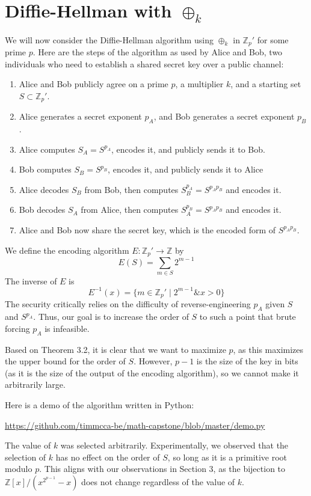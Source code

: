 \documentclass{article}
\newcommand{\zee}{\mathbb{Z}}
\begin{document}
\section{Diffie-Hellman with $\oplus_k$}

We will now consider the Diffie-Hellman algorithm using $\oplus_k$
in $\zee_p'$ for some prime $p$. Here are the steps of the algorithm
as used by Alice and Bob, two individuals who need to establish a
shared secret key over a public channel:
\begin{enumerate}
    \item Alice and Bob publicly agree on a prime $p$,
    a multiplier $k$, and a starting set $S \subset \zee_p'$.
    \item Alice generates a secret exponent $p_A$, and Bob
    generates a secret exponent $p_B$.
    \item Alice computes $S_A = S^{p_A}$, encodes it,
    and publicly sends it to Bob.
    \item Bob computes $S_B = S^{p_B}$, encodes it,
    and publicly sends it to Alice
    \item Alice decodes $S_B$ from Bob,
    then computes $S_B^{p_A} = S^{p_Ap_B}$ and encodes it.
    \item Bob decodes $S_A$ from Alice,
    then computes $S_A^{p_B} = S^{p_Ap_B}$ and encodes it.
    \item Alice and Bob now share the secret key,
    which is the encoded form of $S^{p_Ap_B}$.
\end{enumerate}

We define the encoding algorithm $E: \zee_p' \rightarrow \zee$
by
\[E(S) = \sum_{m \in S} 2^{m-1}\]
The inverse of $E$ is
\[E^{-1}(x) = \{m \in \zee_p' \mid 2^{m-1} \mathbin{\&} x > 0\}\]
The security critically relies on the difficulty of reverse-engineering
$p_A$ given $S$ and $S^{p_A}$. Thus, our goal is to increase the
order of $S$ to such a point that brute forcing $p_A$ is infeasible.

Based on Theorem 3.2, it is clear that we want to maximize $p$, as
this maximizes the upper bound for the order of $S$. However,
$p-1$ is the size of the key in bits (as it is the size of the
output of the encoding algorithm), so we cannot make it arbitrarily large.

Here is a demo of the algorithm written in Python:

\url{https://github.com/timmcca-be/math-capstone/blob/master/demo.py}

The value of $k$ was selected arbitrarily.
Experimentally, we observed that the selection of $k$
has no effect on the order of $S$, so long as it is a
primitive root modulo $p$. This aligns with our observations
in Section 3, as the bijection to $\zee[x]/(x^{2^{p-1}} - x)$
does not change regardless of the value of $k$.
\end{document}
